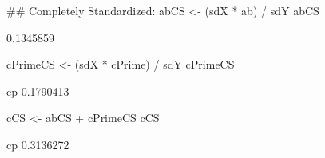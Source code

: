 \begin{Schunk}
\begin{Sinput}
 ## Completely Standardized:
 abCS <- (sdX * ab) / sdY
 abCS
\end{Sinput}
\begin{Soutput}
[1] 0.1345859
\end{Soutput}
\begin{Sinput}
 cPrimeCS <- (sdX * cPrime) / sdY
 cPrimeCS
\end{Sinput}
\begin{Soutput}
       cp 
0.1790413 
\end{Soutput}
\begin{Sinput}
 cCS <- abCS + cPrimeCS
 cCS
\end{Sinput}
\begin{Soutput}
       cp 
0.3136272 
\end{Soutput}
\end{Schunk}

